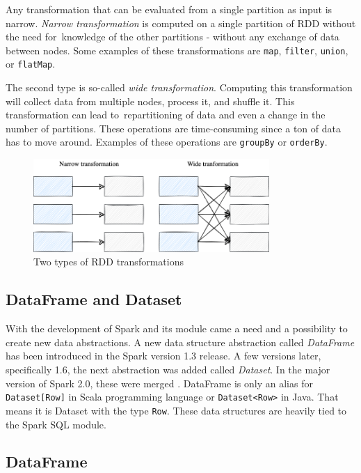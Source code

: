 Any transformation that can be evaluated from a single partition as input is narrow. \textit{Narrow transformation} is computed on a single partition of RDD without the need for~knowledge of the other partitions - without any exchange of data between nodes.
Some examples of these transformations are \texttt{map}, \texttt{filter}, \texttt{union}, or \texttt{flatMap}.

The second type is so-called \textit{wide transformation}. Computing this transformation will collect data from multiple nodes, process it, and shuffle it. This transformation can lead to~repartitioning of data and even a change in the number of partitions.
These operations are time-consuming since a ton of data has to move around.
Examples of these operations are \texttt{groupBy} or \texttt{orderBy}.


\begin{figure}[H]
    \centering
    \includegraphics[width=0.8\textwidth]{obrazky-figures/rdd-types.drawio.png}
    \caption{Two types of RDD transformations}
    \label{fig:rdd-types}
\end{figure}
\pagebreak

\subsection*{DataFrame and Dataset}

With the development of Spark and its module came a need and a possibility to create new data abstractions. A new data structure abstraction called \textit{DataFrame} has been introduced in the Spark version 1.3 release. A few versions later, specifically 1.6, the next abstraction was added called \textit{Dataset}. In the major version of Spark 2.0, these were merged \cite{taleofthree}. DataFrame is only an alias for \texttt{Dataset[Row]} in Scala programming language or \texttt{Dataset<Row>} in Java. That means it is Dataset with the type \texttt{Row}. These data structures are heavily tied to the Spark SQL module. 

\subsection*{DataFrame}

